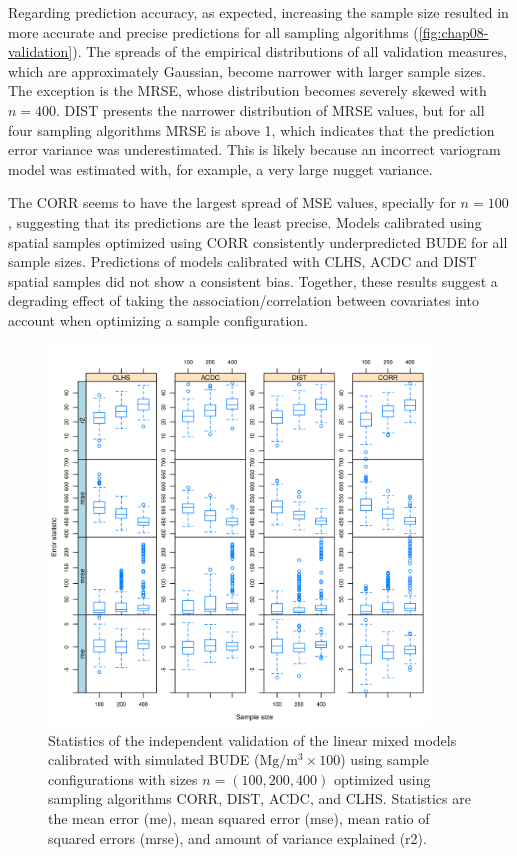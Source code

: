 Regarding prediction accuracy, as expected, increasing the sample size resulted in more accurate and precise 
predictions for all sampling algorithms (\autoref{fig:chap08-validation}). The spreads of the empirical 
distributions of all validation measures, which are approximately Gaussian, become narrower with larger sample 
sizes. The exception is the MRSE, whose distribution becomes severely skewed with $n = 400$. DIST presents the 
narrower distribution of MRSE values, but for all four sampling algorithms MRSE is above 1, which indicates 
that the prediction error variance was underestimated. This is likely because an incorrect variogram model was 
estimated with, for example, a very large nugget variance.

The CORR seems to have the largest spread of MSE values, specially for $n = 100$, suggesting that its 
predictions are the least precise. Models calibrated using spatial samples optimized using CORR consistently 
underpredicted BUDE for all sample sizes. Predictions of models calibrated with CLHS, ACDC and DIST spatial 
samples did not show a consistent bias. Together, these results suggest a degrading effect of taking the 
association/correlation between covariates into account when optimizing a sample configuration.

\begin{figure}[!ht]
 \centering
 \includegraphics[width=0.90\textwidth]{fig/chap08-error-stats}
 \caption[Validation of linear mixed models calibrated using sample configurations optimized using four 
sampling algorithms.]{Statistics of the independent validation of the linear mixed models calibrated with 
simulated BUDE ($\si{\mega\gram\per\cubic\metre} \times 100$) using sample configurations with sizes $n = 
(100, 200, 400)$ optimized using sampling algorithms CORR, DIST,  ACDC, and CLHS. Statistics are the mean error 
(me), mean squared error (mse), mean ratio of squared errors (mrse), and amount of variance explained (r2).}
 \label{fig:chap08-validation}
\end{figure}

